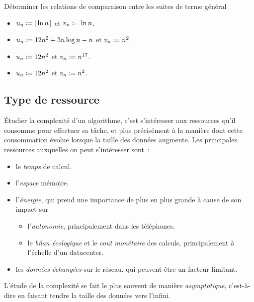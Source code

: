 \documentclass{magnolia}
\begin{document}
\begin{exoUnique}
\exo Déterminer les relations de comparaison entre les suites de terme général
  \begin{itemize}
    \item $u_n\coloneqq \left\lfloor\ln n\right\rfloor$ et $v_n\coloneqq \ln n$.
    \item $u_n\coloneqq 12n^{2} + 3n\log n - n$ et $v_n\coloneqq n^{2}$.
    \item $u_n\coloneqq 12n^{2}$ et $v_n\coloneqq n^{17}$.
    \item $u_n\coloneqq 12n^{2}$ et $v_n\coloneqq n^{2}$.
  \end{itemize}
\end{exoUnique}

\subsection{Type de ressource}

Étudier la complexité d'un algorithme, c'est s'intéresser aux ressources qu'il
consomme pour effectuer sa tâche, et plus précisément à la manière dont
cette consommation évolue lorsque la taille des données augmente. Les principales ressources auxquelles on peut s'intéresser sont~:
\begin{itemize}
  \item le \emph{temps} de calcul.
  \item l'\emph{espace} mémoire.
  \item l'\emph{énergie}, qui prend une importance de plus en plus grande
  à cause de son impact sur
  \begin{itemize}
  \item l'\emph{autonomie}, principalement dans les téléphones.
  \item le \emph{bilan écologique}
  et le \emph{cout monétaire} des calculs, principalement à l'échelle d'un
  datacenter.
  \end{itemize}
  \item les \emph{données échangées}  sur le réseau, qui peuvent être un facteur
  limitant.
\end{itemize}\medskip

L'étude de la complexité se fait le plus souvent de manière
  \emph{asymptotique}, c'est-à-dire en faisant tendre la taille des données vers
  l'infini.
  
\end{document}
